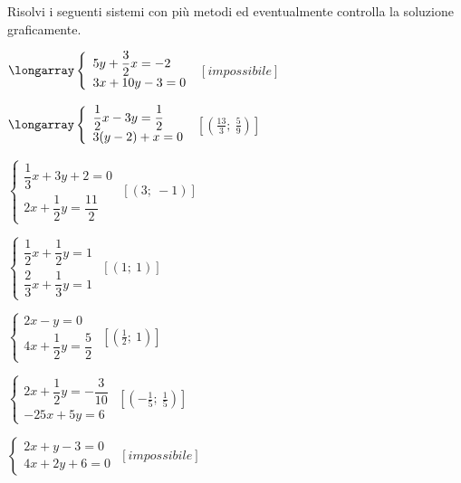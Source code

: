 \begin{esercizio}[\Ast]
 \label{ese:22.71}
 Risolvi i seguenti sistemi con più metodi ed eventualmente controlla
la soluzione graficamente.
\begin{multicols}{2}
\begin{enumeratea}
\item \(\longarray\left\{\begin{array}{l}5y+\dfrac{3}{2}x=-2\\3x+10y-3=0 
\end{array}\right.\)
 \hfill \(\left[impossibile\right]\)
\item 
\(\longarray\left\{\begin{array}{l}\dfrac{1}{2}x-3y=\dfrac{1}{2}\\3(y-2)+x=0 
\end{array}\right.\)
 \hfill \(\left[\left(\frac{13}{3};~\frac{5}{9}\right)\right]\)
\item 
\(\left\{\begin{array}{l}{\dfrac{1}{3}x+3y+2=0}\\{2x+\dfrac{1}{2}y=\dfrac{11}{2}}
\end{array}\right.\)
 \hfill \(\left[(3;~-1)\right]\)
\item 
\(\left\{\begin{array}{l}{\dfrac{1}{2}x+\dfrac{1}{2}y=1}\\{\dfrac{2}{3}x+\dfrac{1
}{3}y=1}\end{array}\right.\)
 \hfill \(\left[(1;~1)\right]\)
 {\longarray
\item 
\(\left\{\begin{array}{l}
{2x-y=0}\\
{4x+\dfrac{1}{2}y=\dfrac{5}{2}}\end{array}\right.\)
 \hfill \(\left[\left(\frac{1}{2};~1\right)\right]\)
\item \(\left\{\begin{array}{l}
{2x+\dfrac{1}{2}y=-\dfrac{3}{10}}\\
{-25x+5y=6}\end{array}\right.\)
 \hfill \(\left[\left(-{\frac{1}{5}};~\frac{1}{5}\right)\right]\)
\item \(\left\{\begin{array}{l}
{2x+y-3=0}\\
{4x+2y+6=0}\end{array}\right.\)
 \hfill \(\left[impossibile\right]\)
}
\end{enumeratea}
\end{multicols}
\end{esercizio}
